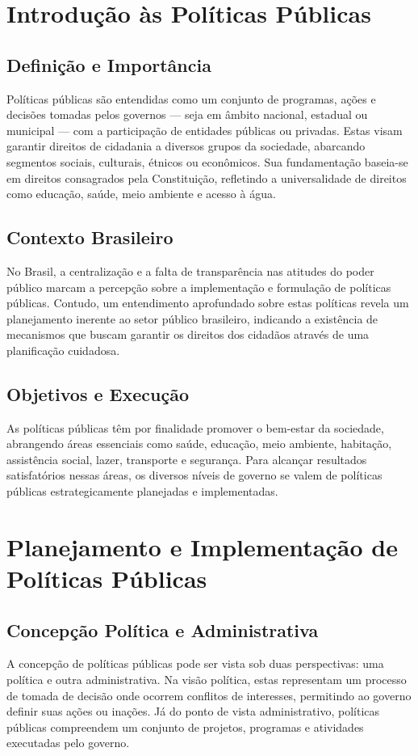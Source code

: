\documentclass[
   article,       
   12pt,          
   oneside,       
   a4paper,       
   english,       
   brazil,        
   sumario=tradicional
   ]{abntex2}
\begin{document}
\section{Introdução às Políticas Públicas}
\subsection{Definição e Importância}
Políticas públicas são entendidas como um conjunto de programas, ações e decisões tomadas pelos governos — seja em âmbito nacional, estadual ou municipal — com a participação de entidades públicas ou privadas. Estas visam garantir direitos de cidadania a diversos grupos da sociedade, abarcando segmentos sociais, culturais, étnicos ou econômicos. Sua fundamentação baseia-se em direitos consagrados pela Constituição, refletindo a universalidade de direitos como educação, saúde, meio ambiente e acesso à água.

\subsection{Contexto Brasileiro}
No Brasil, a centralização e a falta de transparência nas atitudes do poder público marcam a percepção sobre a implementação e formulação de políticas públicas. Contudo, um entendimento aprofundado sobre estas políticas revela um planejamento inerente ao setor público brasileiro, indicando a existência de mecanismos que buscam garantir os direitos dos cidadãos através de uma planificação cuidadosa.

\subsection{Objetivos e Execução}
As políticas públicas têm por finalidade promover o bem-estar da sociedade, abrangendo áreas essenciais como saúde, educação, meio ambiente, habitação, assistência social, lazer, transporte e segurança. Para alcançar resultados satisfatórios nessas áreas, os diversos níveis de governo se valem de políticas públicas estrategicamente planejadas e implementadas.

\section{Planejamento e Implementação de Políticas Públicas}
\subsection{Concepção Política e Administrativa}
A concepção de políticas públicas pode ser vista sob duas perspectivas: uma política e outra administrativa. Na visão política, estas representam um processo de tomada de decisão onde ocorrem conflitos de interesses, permitindo ao governo definir suas ações ou inações. Já do ponto de vista administrativo, políticas públicas compreendem um conjunto de projetos, programas e atividades executadas pelo governo.
\end{document}
